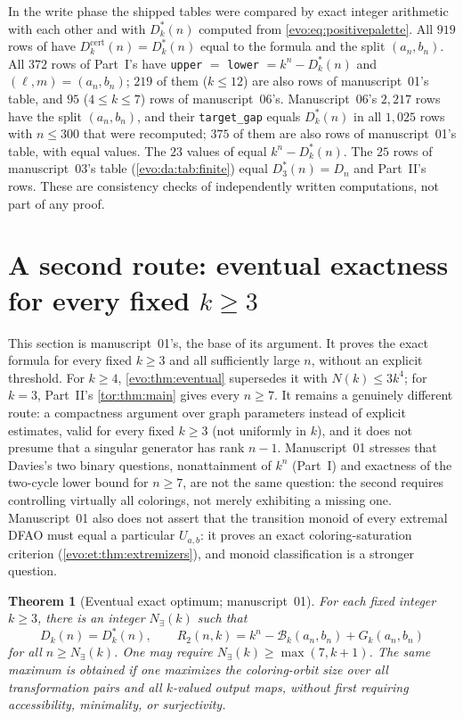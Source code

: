 \documentclass[11pt,a4paper]{article}
\numberwithin{equation}{section}
\newtheorem{theorem}{Theorem}[section]
\theoremstyle{definition}
\theoremstyle{remark}
\newcommand{\Bip}{\mathcal B}
\begin{document}
In the write phase the shipped tables were compared by exact integer
arithmetic with each other and with $D^*_k(n)$ computed from
\eqref{evo:eq:positivepalette}. All $919$ rows of
 have
$D^{\mathrm{cert}}_k(n)=D^*_k(n)$ equal to the formula and the split
$(a_n,b_n)$. All $372$ rows of Part~I's 
have \texttt{upper} $=$ \texttt{lower} $=k^n-D^*_k(n)$ and $(\ell,m)=(a_n,b_n)$;
$219$ of them ($k\le12$) are also rows of manuscript~01's table, and $95$
($4\le k\le7$) rows of manuscript~06's. Manuscript~06's $2{,}217$ rows have
the split $(a_n,b_n)$, and their \texttt{target\_gap} equals $D^*_k(n)$ in
all $1{,}025$ rows with $n\le300$ that were recomputed; $375$ of them are also
rows of manuscript~01's table, with equal values. The $23$ values of
 equal $k^n-D^*_k(n)$. The
$25$ rows of manuscript~03's table (\cref{evo:da:tab:finite}) equal
$D^*_3(n)=D_n$ and Part~II's rows. These are consistency checks of
independently written computations, not part of any proof.

\section{A second route: eventual exactness for every fixed \texorpdfstring{$k\ge3$}{k >= 3}}\label{evo:sec:separation}

This section is manuscript~01's, the base of its argument. It proves the
exact formula for every fixed $k\ge3$ and all sufficiently large $n$, without
an explicit threshold. For $k\ge4$, \cref{evo:thm:eventual} supersedes it
with $N(k)\le3k^4$; for $k=3$, Part~II's \cref{tor:thm:main} gives every
$n\ge7$. It remains a genuinely different route: a compactness argument over
graph parameters instead of explicit estimates, valid for every fixed
$k\ge3$ (not uniformly in $k$), and it does not presume that a singular
generator has rank $n-1$. Manuscript~01 stresses that Davies's two binary
questions, nonattainment of $k^n$ (Part~I) and exactness of the two-cycle
lower bound for $n\ge7$, are not the same question: the second requires
controlling virtually all colorings, not merely exhibiting a missing one.
Manuscript~01 also does not assert that the transition monoid of every
extremal DFAO must equal a particular $U_{a,b}$: it proves an exact
coloring-saturation criterion (\cref{evo:et:thm:extremizers}), and monoid
classification is a stronger question.

\begin{theorem}[Eventual exact optimum; manuscript~01]\label{evo:et:thm:main}
For each fixed integer $k\ge3$, there is an integer $N_\exists(k)$ such that
\begin{equation}\label{evo:et:eq:main}
 D_k(n)=D^*_k(n),\qquad
 R_2(n,k)=k^n-\Bip_k(a_n,b_n)+G_k(a_n,b_n)
\end{equation}
for all $n\ge N_\exists(k)$. One may require $N_\exists(k)\ge\max(7,k+1)$.
The same maximum is obtained if one maximizes the coloring-orbit size over
\emph{all} transformation pairs and all $k$-valued output maps, without first
requiring accessibility, minimality, or surjectivity.
\end{theorem}
\end{document}
